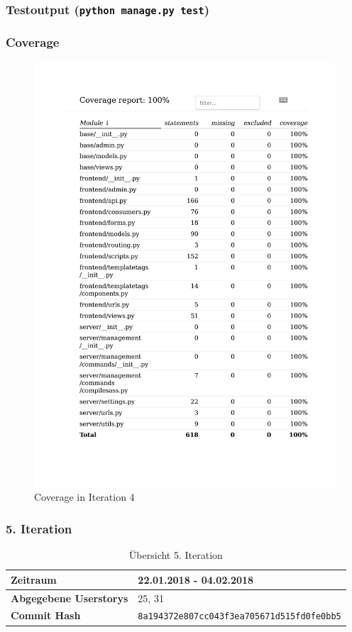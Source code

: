 \subsubsection{Testoutput (\texttt{python manage.py test})}

\subsubsection{Coverage}
\begin{figure}[H]
	\centering
\includegraphics[width=.9\textwidth]{test_output/04_iteration_coverage.pdf}
	\caption{Coverage in Iteration 4}
\end{figure}

\subsubsection{5. Iteration}
\begin{table}[H]
\begin{center}
	\begin{tabular}{| l | l |}
		\hline
		\textbf{Zeitraum} &  22.01.2018 - 04.02.2018\\\hline
		\textbf{Abgegebene Userstorys} & 25, 31\\\hline
		\textbf{Commit Hash} & \texttt{8a194372e807cc043f3ea705671d515fd0fe0bb5} \\\hline
	\end{tabular}
	\caption{Übersicht 5. Iteration}
\end{center}
\end{table}
